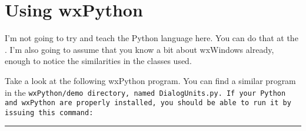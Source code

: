 \section{Using wxPython}\label{wxpusing}


I'm not going to try and teach the Python language here. You can do
that at the .
I'm also going to assume that you know a bit about wxWindows already,
enough to notice the similarities in the classes used.

Take a look at the following wxPython program. You can find a similar
program in the \tt{wxPython/demo} directory, named \tt{DialogUnits.py}. If your
Python and wxPython are properly installed, you should be able to run
it by issuing this command:

\begin{indented}{1cm}
\end{indented}

\hrule

